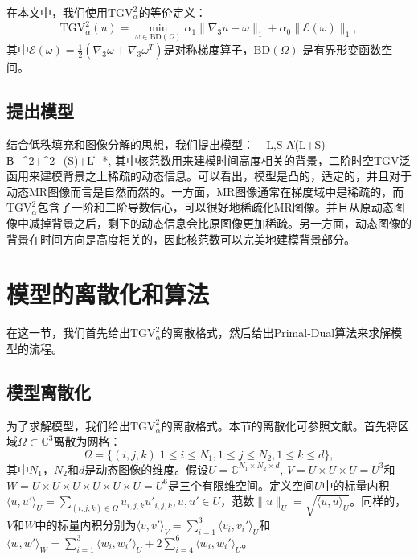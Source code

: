 在本文中，我们使用$\mathrm{TGV}_{\alpha}^2$的等价定义：
$$\mathrm{TGV}_\alpha^2(u)=\min_{\omega\in \mathrm{BD}(\Omega)}\alpha_1\|\nabla_3 u-\omega\|_1 + \alpha_0\|\mathcal{E}(\omega)\|_1,$$
其中$\mathcal{E}(\omega)=\frac{1}{2}(\nabla_3\omega+\nabla_3\omega^{T})$是对称梯度算子，$\mathrm{BD}(\Omega)$ 是有界形变函数空间。

\subsection{提出模型}
结合低秩填充和图像分解的思想，我们提出模型：
\beq
\min_{L,S} \|A(L+S)-B\|_{}^2+^2_\alpha(S)+\beta\|L\|_*,
\label{equ:proposed}
\eeq
其中核范数用来建模时间高度相关的背景，二阶时空TGV泛函用来建模背景之上稀疏的动态信息。可以看出，模型是凸的，适定的，并且对于动态MR图像而言是自然而然的。一方面，MR图像通常在梯度域中是稀疏的，而$\mathrm{TGV}_{\alpha}^2$包含了一阶和二阶导数信心，可以很好地稀疏化MR图像。并且从原动态图像中减掉背景之后，剩下的动态信息会比原图像更加稀疏。另一方面，动态图像的背景在时间方向是高度相关的，因此核范数可以完美地建模背景部分。

\section{模型的离散化和算法}
在这一节，我们首先给出$\mathrm{TGV}_{\alpha}^2$的离散格式，然后给出Primal-Dual算法来求解模型的流程。

\subsection{模型离散化}
为了求解模型，我们给出$\mathrm{TGV}_{\alpha}^2$的离散格式。本节的离散化可参照文献\cite{tgv,pd}。首先将区域$\Omega\subset\mathbb{C}^3$离散为网格：
$$\Omega=\{(i,j,k)\big|1\leq i\leq N_1, 1\leq j\leq N_2, 1\leq k\leq d\},$$
其中$N_1$，$N_2$和$d$是动态图像的维度。假设$U=\mathbb{C}^{N_1\times N_2\times d}$, $V=U\times U\times U=U^3$和$W=U\times U\times U\times U\times U\times U=U^6$是三个有限维空间。定义空间$U$中的标量内积$\langle u,u' \rangle _U=\sum_{(i,j,k)\in \Omega}u_{i,j,k}u'_{i,j,k}, u,u'\in U$，范数$\|u\|_U=\sqrt{\langle u,u \rangle _U}$。同样的，$V$和$W$中的标量内积分别为$\langle v,v'\rangle_V=\sum_{i=1}^3\langle v_i,v_i'\rangle_U$和$\langle w,w'\rangle_W=\sum_{i=1}^3\langle w_i,w_i'\rangle_U + 2\sum_{i=4}^6\langle w_i,w_i'\rangle_U$。

